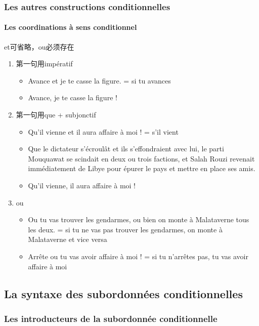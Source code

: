 \documentclass[UTF8]{report}
\begin{document}
\subsubsection{Les autres constructions conditionnelles}
\paragraph{Les coordinations à sens conditionnel}
et可省略，ou必须存在
\begin{enumerate}
    \item 第一句用impératif
    \begin{itemize}
        \item Avance et je te casse la figure. = si tu avances
        \item Avance, je te casse la figure !
    \end{itemize}
    \item 第一句用que + subjonctif
    \begin{itemize}
        \item Qu’il vienne et il aura affaire à moi ! = s’il vient
        \item Que le dictateur s’écroulât et ils s’effondraient avec lui, le parti Mouquawat se scindait en deux ou trois factions, et Salah Rouzi revenait immédiatement de Libye pour épurer le pays et mettre en place ses amis.
        \item Qu’il vienne, il aura affaire à moi !
    \end{itemize}
    \item ou 
    \begin{itemize}
        \item Ou tu vas trouver les gendarmes, ou bien on monte à Malataverne tous les deux. = si tu ne vas pas trouver les gendarmes, on monte à Malataverne et vice versa
        \item Arrête ou tu vas avoir affaire à moi ! = si tu n’arrêtes pas, tu vas avoir affaire à moi
    \end{itemize}
\end{enumerate}

\subsection{La syntaxe des subordonnées conditionnelles}
\subsubsection{Les introducteurs de la subordonnée conditionnelle}
\end{document}

